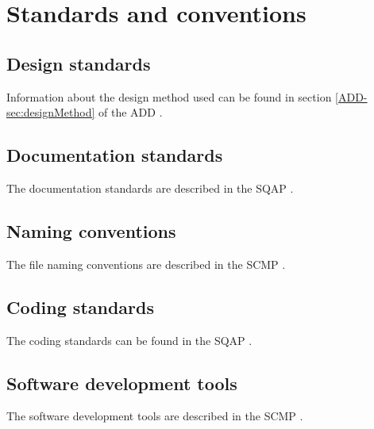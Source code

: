 \chapter{Standards and conventions}
\label{chap:impStandConv}

\section{Design standards}
Information about the design method used can be found in section \ref{ADD-sec:designMethod} of the ADD \cite{add}.

\section{Documentation standards}
The documentation standards are described in the SQAP \cite{sqap}.

\section{Naming conventions}
The file naming conventions are described in the SCMP \cite{scmp}.

\section{Coding standards}
The coding standards can be found in the SQAP \cite{sqap}.

\section{Software development tools}
The software development tools are described in the SCMP \cite{scmp}.